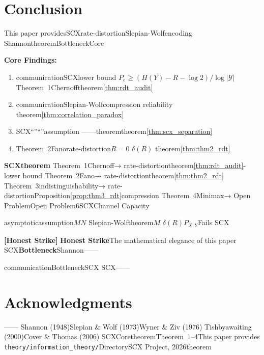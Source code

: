 \documentclass[11pt,a4paper]{article}
\theoremstyle{remark}
\newcommand{\Y}{\mathcal{Y}}
\newcommand{\honeststrike}{\textnormal{\textbf{[Honest Strike]}}}
\begin{document}
\section{Conclusion}

This paper providesSCXrate-distortionSlepian-Wolfencoding
ShannontheoremBottleneckCore


\textbf{Core Findings:}
\begin{enumerate}[label=(\arabic*)]
    \item communicationSCXlower bound
          $P_e \geq (H(Y) - R - \log 2)/\log |\Y|$
          Theorem~1Chernofftheorem\ref{thm:rdt_audit}
    \item communicationSlepian-Wolfcompression
          reliability
          theorem\ref{thm:correlation_paradox}
    \item SCX``''``''assumption
          ——theoremtheorem\ref{thm:scx_separation}
    \item Theorem~2Fanorate-distortion$R=0$
          $\delta(R)$\textbf{}
          theorem\ref{thm:thm2_rdt}
\end{enumerate}

\textbf{SCXtheorem}
Theorem~1Chernoff→ rate-distortiontheorem\ref{thm:rdt_audit}-lower bound
Theorem~2Fano→ rate-distortiontheorem\ref{thm:thm2_rdt}
Theorem~3indistinguishability→ rate-distortionProposition\ref{prop:thm3_rdt}compression
Theorem~4Minimax→ Open ProblemOpen Problem6SCXChannel Capacity

\textbf{}asymptoticassumption$M$$N$
Slepian-Wolftheorem$M$
$\delta(R)$$P_{X,Y}$Fails
SCX\textbf{}

\honeststrike{} \textbf{Honest Strike}The mathematical elegance of this paper
SCX\textbf{Bottleneck}Shannon\textbf{}——

communicationBottleneckSCX
SCX——


\section*{Acknowledgments}

——
Shannon (1948)Slepian \& Wolf (1973)Wyner \& Ziv (1976)
Tishbyawaiting (2000)Cover \& Thomas (2006)
SCXCoretheoremTheorem~1--4This paper provides
\texttt{theory/information\_theory/}DirectorySCX Project, 2026theorem
\end{document}
